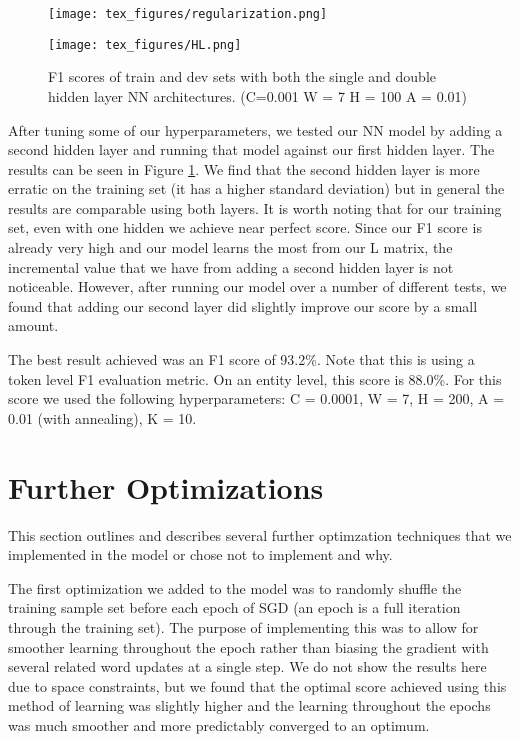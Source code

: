 \documentclass{article}
\begin{document}
\begin{figure}[ht]
\begin{minipage}[b]{0.45\linewidth}
\centering
\texttt{[image: tex\_figures/regularization.png]}
\caption{F1 scores of train and dev sets with a 1 hidden layer model varying the regularization constant. ( W = 5  H = 100 A = 0.01)}
\label{varyregularization}
\end{minipage}
\hspace{0.5cm}
\begin{minipage}[b]{0.45\linewidth}
\centering
\texttt{[image: tex\_figures/HL.png]}
\caption{F1 scores of train and dev sets with both the single and double hidden layer NN architectures. (C=0.001 W = 7  H = 100 A = 0.01)}
\label{numhl}
\end{minipage}
\end{figure}

After tuning some of our hyperparameters, we tested our NN model by adding a second hidden layer and running that model against our first hidden layer. The results can be seen in Figure \ref{numhl}. We find that the second hidden layer is more erratic on the training set (it has a higher standard deviation) but in general the results are comparable using both layers. It is worth noting that for our training set, even with one hidden we achieve near perfect score. Since our F1 score is already very high and our model learns the most from our L matrix, the incremental value that we have from adding a second hidden layer is not noticeable. However, after running our model over a number of different tests, we found that adding our second layer did slightly improve our score by a small amount.

The best result achieved was an F1 score of 93.2\%. Note that this is using a token level F1 evaluation metric. On an entity level, this score is 88.0\%. For this score we used the following hyperparameters: C = 0.0001, W = 7, H = 200, A = 0.01 (with annealing), K = 10.

\section{Further Optimizations}

This section outlines and describes several further optimzation techniques that we implemented in the model or chose not to implement and why.

The first optimization we added to the model was to randomly shuffle the training sample set before each epoch of SGD (an epoch is a full iteration through the training set).  The purpose of implementing this was to allow for smoother learning throughout the epoch rather than biasing the gradient with several related word updates at a single step.  We do not show the results here due to space constraints, but we found that the optimal score achieved using this method of learning was slightly higher and the learning throughout the epochs was much smoother and more predictably converged to an optimum.
\end{document}
